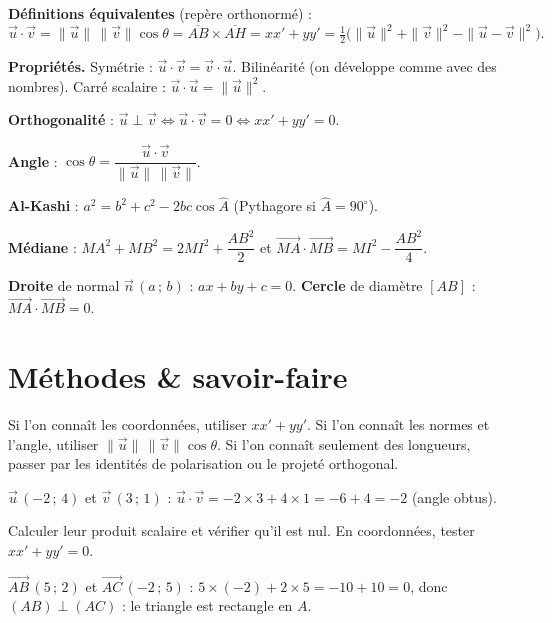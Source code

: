 \begin{synthese}
\textbf{Définitions équivalentes} (repère orthonormé) :
\[ \vec{u}\cdot\vec{v}=\|\vec{u}\|\,\|\vec{v}\|\cos\theta
   =\overline{AB}\times\overline{AH}=xx'+yy'
   =\tfrac12\big(\|\vec{u}\|^2+\|\vec{v}\|^2-\|\vec{u}-\vec{v}\|^2\big). \]

\smallskip
\textbf{Propriétés.} Symétrie : $\vec{u}\cdot\vec{v}=\vec{v}\cdot\vec{u}$.
Bilinéarité (on développe comme avec des nombres). Carré scalaire :
$\vec{u}\cdot\vec{u}=\|\vec{u}\|^2$.

\smallskip
\textbf{Orthogonalité} : $\vec{u}\perp\vec{v}\iff\vec{u}\cdot\vec{v}=0\iff xx'+yy'=0$.

\smallskip
\textbf{Angle} : $\cos\theta=\dfrac{\vec{u}\cdot\vec{v}}{\|\vec{u}\|\,\|\vec{v}\|}$.

\smallskip
\textbf{Al-Kashi} : $a^2=b^2+c^2-2bc\cos\widehat{A}$ (Pythagore si $\widehat{A}=90^\circ$).

\smallskip
\textbf{Médiane} : $MA^2+MB^2=2MI^2+\dfrac{AB^2}{2}$ et
$\vec{MA}\cdot\vec{MB}=MI^2-\dfrac{AB^2}{4}$.

\smallskip
\textbf{Droite} de normal $\vec{n}\,(a\,;\,b)$ : $ax+by+c=0$.
\textbf{Cercle} de diamètre $[AB]$ : $\vec{MA}\cdot\vec{MB}=0$.
\end{synthese}

\section{Méthodes \& savoir-faire}

Si l'on connaît les coordonnées, utiliser $xx'+yy'$. Si l'on connaît les normes et
l'angle, utiliser $\|\vec{u}\|\,\|\vec{v}\|\cos\theta$. Si l'on connaît seulement des
longueurs, passer par les identités de polarisation ou le projeté orthogonal.
\begin{exemple}
$\vec{u}\,(-2\,;\,4)$ et $\vec{v}\,(3\,;\,1)$ :
$\vec{u}\cdot\vec{v}=-2\times3+4\times1=-6+4=-2$ (angle obtus).
\end{exemple}

Calculer leur produit scalaire et vérifier qu'il est nul. En coordonnées, tester
$xx'+yy'=0$.
\begin{exemple}
$\vec{AB}\,(5\,;\,2)$ et $\vec{AC}\,(-2\,;\,5)$ : $5\times(-2)+2\times5=-10+10=0$, donc
$(AB)\perp(AC)$ : le triangle est rectangle en $A$.
\end{exemple}

